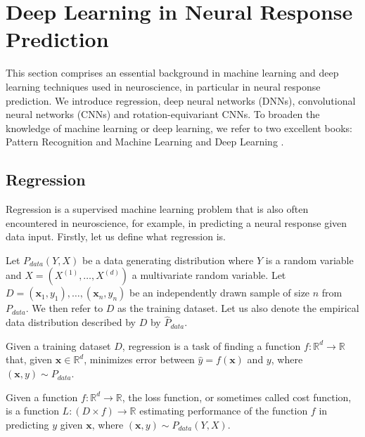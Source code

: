 \overfullrule=0pt
\chapter{Deep Learning in Neural Response Prediction}

This section comprises an essential background in machine learning and deep learning techniques used in neuroscience, in particular in neural response prediction. We introduce regression, deep neural networks (DNNs), convolutional neural networks (CNNs) and rotation-equivariant CNNs. To broaden the knowledge of machine learning or deep learning, we refer to two excellent books: Pattern Recognition and Machine Learning \citep{bishop2006pattern} and Deep Learning \citep{Goodfellow-et-al-2016}.

\section{Regression}\label{section:regression}

Regression is a supervised machine learning problem that is also often encountered in neuroscience, for example, in predicting a neural response given data input. Firstly, let us define what regression is.

\begin{defn}\label{def01:1}
	Let $P_{data}(Y, X)$ be a data generating distribution where $Y$ is a random variable and $X = (X^{(1)}, … , X^{(d)})$ a multivariate random variable. Let $D = {(\textbf{x}_1, y_1), \dots, (\textbf{x}_n, y_n)}$ be an independently drawn sample of size $n$ from $P_{data}$. We then refer to $D$ as the training dataset. Let us also denote the empirical data distribution described by $D$ by $\hat{P}_{data}$.
\end{defn}

\begin{defn}[Regression]\label{def01:3}
Given a training dataset $D$, regression is a task of finding a function $f: \mathbb{R}^d \to \mathbb{R}$ that, given $\textbf{x} \in \mathbb{R}^d$, minimizes error between $\hat{y} = f(\textbf{x})$ and $y$, where $(\textbf{x}, y) \sim P_{data}$.

\end{defn}

\begin{defn}\label{def01:2}
	Given a function $f: \mathbb{R}^d \to \mathbb{R}$, the loss function, or sometimes called cost function, is a function $L: (D \times f) \to \mathbb{R}$ estimating performance of the function $f$ in predicting $y$ given $\textbf{x}$, where $(\textbf{x}, y) \sim P_{data}(Y, X)$.
\end{defn}


